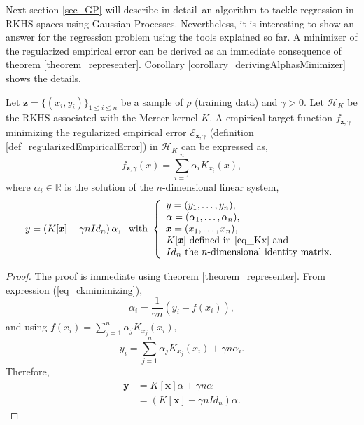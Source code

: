 Next section \ref{sec_GP} will describe in detail an algorithm to tackle regression in RKHS spaces using Gaussian Processes. Nevertheless, it is interesting to show an answer for the regression problem using the tools explained so far. A minimizer of the regularized empirical error can be derived as an immediate consequence of theorem \ref{theorem_representer}. Corollary \ref{corollary_derivingAlphasMinimizer} shows the details.

\begin{corollary} 
  \label{corollary_derivingAlphasMinimizer}
  Let $\pmb{z} = \{(x_i,y_i)\}_{1 \leq i \leq n}$ be a sample of $\rho$ (training data) and $\gamma > 0$. Let $\mathcal{H}_K$ be the RKHS associated with the Mercer kernel $K$. A empirical target function $f_{\pmb{z},\gamma}$ minimizing the regularized empirical error $\mathcal{E}_{\pmb{z},\gamma}$ (definition \ref{def_regularizedEmpiricalError}) in $\mathcal{H}_K$ can be expressed as,
  \begin{equation*}
    f_{\pmb{z},\gamma}(x) = \sum_{i=1}^n \alpha_i K_{x_i}(x), 
  \end{equation*}    
  where $\alpha_i \in \mathbb{R}$ is the solution of the $n$-dimensional linear system,
  \begin{equation} \label{eq_alphaLinearSystem}
    y = \left( K[\pmb{x}] + \gamma n Id_n \right) \alpha, \ \text{ with } \left\{
    \begin{array}{l}
      y = (y_1, \dots, y_n),  \\
      \alpha = (\alpha_1, \dots, \alpha_n), \\
      \pmb{x} = (x_1, \dots, x_n), \\ 
      K[\pmb{x}] \text{ defined in \ref{eq_Kx} and} \\
      Id_n \text{ the $n$-dimensional identity matrix}. \\
    \end{array}
    \right. 
  \end{equation}
  \begin{proof}
    The proof is immediate using theorem \ref{theorem_representer}. From expression (\ref{eq_ckminimizing}),
    \begin{equation*}
      \alpha_i = \frac{1}{\gamma n} \left( y_i - f(x_i) \right), 
    \end{equation*}
    and using $f(x_i) = \sum_{j=1}^n \alpha_j K_{x_j}(x_i)$,
    \begin{equation*}
      y_i = \sum_{j=1}^n \alpha_j K_{x_j}(x_i) + \gamma n \alpha_i. 
    \end{equation*} 
    Therefore,
    \begin{equation*}
      \begin{aligned}
        \pmb{y} &= K[\pmb{x}] \alpha + \gamma n \alpha \\
                &= \left( K[\pmb{x}] + \gamma n Id_n \right) \alpha.
      \end{aligned}
    \end{equation*}
  \end{proof}
\end{corollary}

